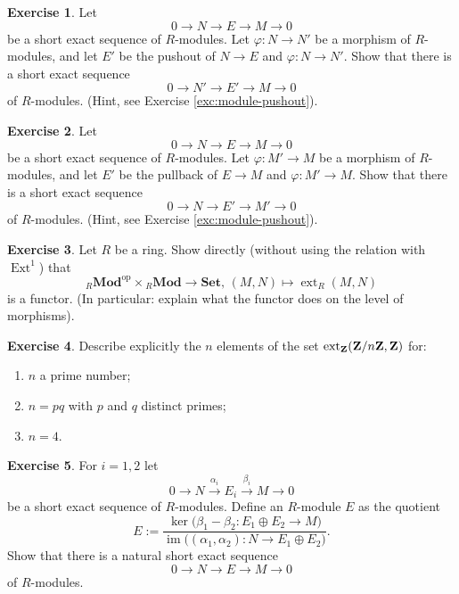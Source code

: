 \documentclass[11pt]{amsbook}
\newcommand{\longto}{\longrightarrow}
\DeclareMathOperator\Mod{{\bf{Mod}}}
\DeclareMathOperator\im{im}
\DeclareMathOperator\Ext{Ext}
\DeclareMathOperator\ext{ext}
\def\opp{\mathrm{op}}
\def\Set{\mathbf{Set}}
\def\Mod{\mathbf{Mod}}
\theoremstyle{plain}
\theoremstyle{definition}
\newtheorem{exercise}{Exercise}
\begin{document}
\begin{exercise}
Let 
\[
	0 \longto N \longto E \longto M \longto 0
\]
be a short exact sequence of $R$-modules. Let $\varphi\colon N\to N'$ be a morphism of $R$-modules, and let $E'$ 
be the pushout of $N\to E$ and $\varphi\colon N\to N'$. Show that there is a short exact sequence
\[
	0 \longto N' \longto E' \longto M \longto 0
\]
of $R$-modules. (Hint, see Exercise \ref{exc:module-pushout}).
\end{exercise}


\begin{exercise}
Let 
\[
	0 \longto N \longto E \longto M \longto 0
\]
be a short exact sequence of $R$-modules. Let $\varphi\colon M'\to M$ be a morphism of $R$-modules, and let $E'$ 
be the pullback of $E\to M$ and $\varphi\colon M'\to M$. Show that there is a short exact sequence
\[
	0 \longto N \longto E' \longto M' \longto 0
\]
of $R$-modules. (Hint, see Exercise \ref{exc:module-pushout}).
\end{exercise}


\begin{exercise}
Let $R$ be a ring. Show directly (without using the relation with $\Ext^1$) that
\[
	{}_R\Mod^\opp \times {}_R\Mod \to \Set,\,
	(M,N) \mapsto \ext_R(M,N)
\]
is a functor. (In particular: explain what the functor does on the level of morphisms).
\end{exercise}

\begin{exercise}\label{exc:extensions-Z-mod-n}
Describe explicitly the $n$ elements of the set $\ext_\bZ(\bZ/n\bZ,\bZ)$ for:
\begin{enumerate}
\item $n$ a prime number;
\item $n=pq$ with $p$ and $q$ distinct primes;
\item $n=4$.
\end{enumerate}
\end{exercise}

\begin{exercise}For $i=1,2$ let
\[
	 0 \longto N \overset{\alpha_i}\longto E_i \overset{\beta_i}\longto M \longto 0
\]
be a short exact sequence of $R$-modules. Define an $R$-module $E$ as the quotient
\[
	E := \frac{\ker \big( \beta_1 - \beta_2 \colon E_1 \oplus E_2 \to M \big)}
	{\im \big( (\alpha_1,\alpha_2) \colon N \to E_1 \oplus E_2 \big)}.
\]
Show that there is a natural short exact sequence
\[
	0 \longto N \longto E \longto M \longto 0
\] 
of $R$-modules.
\end{exercise}
\end{document}
